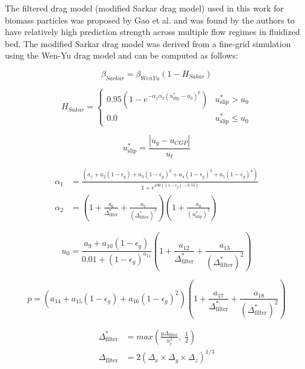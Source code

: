 The filtered drag model (modified Sarkar drag model) used in this work for biomass particles was proposed by Gao et al. \cite{Gao-2018} and was found by the authors to have relatively high prediction strength across multiple flow regimes in fluidized bed. The modified Sarkar drag model was derived from a fine-grid simulation using the Wen-Yu drag model and can be computed as follows:

\begin{equation}
    \beta_{Sarkar} = \beta_{WenYu} (1 - H_{Sakar})
\end{equation}

\begin{equation}
    H_{Sakar} =
    \begin{cases}
        0.95 \left(1 - e^{-\alpha_1 \alpha_2 (u_{\text{slip}}^* - u_0)^p} \right) & u_{\text{slip}}^* > u_0 \\
        0.0 & u_{\text{slip}}^* \leq u_0
    \end{cases}
\end{equation}

\begin{equation}
    u_{\text{slip}}^* = \frac{|u_g - u_{CGP}|}{u_t}
\end{equation}

\begin{align}
    \alpha_1 &= \frac{\left(a_1 + a_2(1 - \epsilon_g) + a_3(1 - \epsilon_g)^2 + a_4(1 - \epsilon_g)^3 + a_5(1 - \epsilon_g)^4 \right)}{1 + e^{100 \left((1 - \epsilon_g) - 0.55 \right)}} \\
    \alpha_2 &= \left(1 + \frac{a_6}{\Delta_{\text{filter}}^*} + \frac{a_7}{(\Delta_{\text{filter}}^*)^2} \right) \left(1 + \frac{a_8}{(u_{\text{slip}}^*)^2} \right)
\end{align}

\begin{equation}
    u_0 = \frac{a_9 + a_{10} (1 - \epsilon_g)}{0.01 + (1 - \epsilon_g)^{a_{11}}} \left(1 + \frac{a_{12}}{\Delta_{\text{filter}}^*} + \frac{a_{13}}{(\Delta_{\text{filter}}^*)^2} \right)
\end{equation}

\begin{equation}
    p = \left(a_{14} + a_{15}(1 - \epsilon_g) + a_{16}(1 - \epsilon_g)^2 \right) \left(1 + \frac{a_{17}}{\Delta_{\text{filter}}^*} + \frac{a_{18}}{(\Delta_{\text{filter}}^*)^2} \right)
\end{equation}

\begin{align}
    \Delta_{\text{filter}}^* &= max\left( \frac{g \Delta_{\text{filter}}}{u_t^2}, \; \frac{1}{2} \right) \\
    \Delta_{\text{filter}} &= 2 (\Delta_x \times \Delta_y \times \Delta_z)^{1/3}
\end{align}

